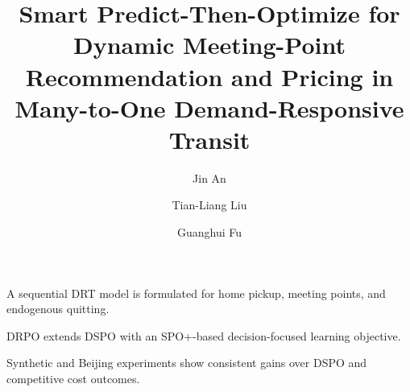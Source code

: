 \documentclass[preprint,12pt,authoryear]{elsarticle}
\begin{document}
\begin{frontmatter}

\title{Smart Predict-Then-Optimize for Dynamic Meeting-Point Recommendation and Pricing in Many-to-One Demand-Responsive Transit}

\author[aff1]{Jin An}
\author[aff1]{Tian-Liang Liu}
\author[aff1]{Guanghui Fu}

\address[aff1]{MoE Key Laboratory of Complex System Analysis and Management Decision, School of Economics and Management, Beihang University, Beijing 100191, China}

\begin{highlights}
\item A sequential DRT model is formulated for home pickup, meeting points, and endogenous quitting.
\item DRPO extends DSPO with an SPO+-based decision-focused learning objective.
\item Synthetic and Beijing experiments show consistent gains over DSPO and competitive cost outcomes.
\end{highlights}


\end{frontmatter}
\end{document}
